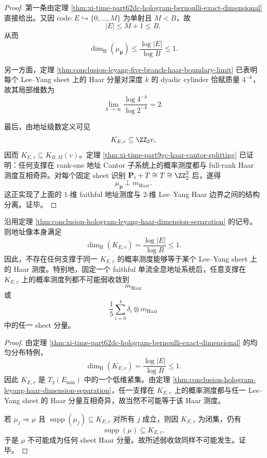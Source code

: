 \begin{proof}
第一条由定理 \ref{thm:xi-time-part62dc-hologram-bernoulli-exact-dimensional} 直接给出。又因 \(\mathrm{code}:E\hookrightarrow\{0,\dots,M\}\) 为单射且 \(M<B\)，故
\[
|E|\le M+1\le B,
\]
从而
\[
\dim_{\mathrm H}(\mu_{\mathbf p})
\le
\frac{\log|E|}{\log B}
\le 1.
\]

另一方面，定理 \ref{thm:conclusion-leyang-five-branch-haar-boundary-limit} 已表明每个 Lee--Yang sheet 上的 Haar 分量对深度 \(k\) 的 dyadic cylinder 恰赋质量 \(4^{-k}\)，故其局部维数为
\[
\lim_{k\to\infty}\frac{\log 4^{-k}}{\log 2^{-k}}=2.
\]

最后，由地址级数定义可见
\[
K_{E,v}\subseteq \ZZ_2 v,
\]
因而 \(K_{E,v}\subseteq K_{B,M}(v)\)。定理 \ref{thm:xi-time-part9gc-haar-cantor-splitting} 已证明：任何支撑在 rank-one 地址 Cantor 子系统上的概率测度都与 full-rank Haar 测度互相奇异。对每个固定 sheet 识别 \( \mathbf P_i+T\cong T\cong \ZZ_2^2\) 后，遂得
\[
\mu_{\mathbf p}\perp m_{\mathrm{Haar}}.
\]
这正实现了上面的 \(1\)-维 faithful 地址测度与 \(2\)-维 Lee--Yang Haar 边界之间的结构分离。证毕。
\end{proof}

\begin{corollary}\label{cor:conclusion-hologram-leyang-haar-balance-impossible}
沿用定理 \ref{thm:conclusion-hologram-leyang-haar-dimension-separation} 的记号。则地址像本身满足
\[
\dim_{\mathrm H}(K_{E,v})=\frac{\log|E|}{\log B}\le 1.
\]
因此，不存在任何支撑于同一 \(K_{E,v}\) 的概率测度能够等于某个 Lee--Yang sheet 上的 Haar 测度。特别地，固定一个 faithful 单流全息地址系统后，任意支撑在 \(K_{E,v}\) 上的概率测度列都不可能弱收敛到
\[
m_{\mathrm{Haar}}
\]
或
\[
\frac15\sum_{i=0}^{4}\delta_i\otimes m_{\mathrm{Haar}}
\]
中的任一 sheet 分量。
\end{corollary}

\begin{proof}
由定理 \ref{thm:xi-time-part62dc-hologram-bernoulli-exact-dimensional} 的均匀分布特例，
\[
\dim_{\mathrm H}(K_{E,v})=\frac{\log|E|}{\log B}\le 1.
\]
因此 \(K_{E,v}\) 是 \(T_2(E_{\min})\) 中的一个低维紧集。由定理 \ref{thm:conclusion-hologram-leyang-haar-dimension-separation}，任一支撑在 \(K_{E,v}\) 上的概率测度都与任一 Lee--Yang sheet 的 Haar 分量互相奇异，故当然不可能等于该 Haar 测度。

若 \(\mu_j\Rightarrow \mu\) 且 \(\operatorname{supp}(\mu_j)\subseteq K_{E,v}\) 对所有 \(j\) 成立，则因 \(K_{E,v}\) 为闭集，仍有
\[
\operatorname{supp}(\mu)\subseteq K_{E,v}.
\]
于是 \(\mu\) 不可能成为任何 sheet Haar 分量。故所述弱收敛同样不可能发生。证毕。
\end{proof}

